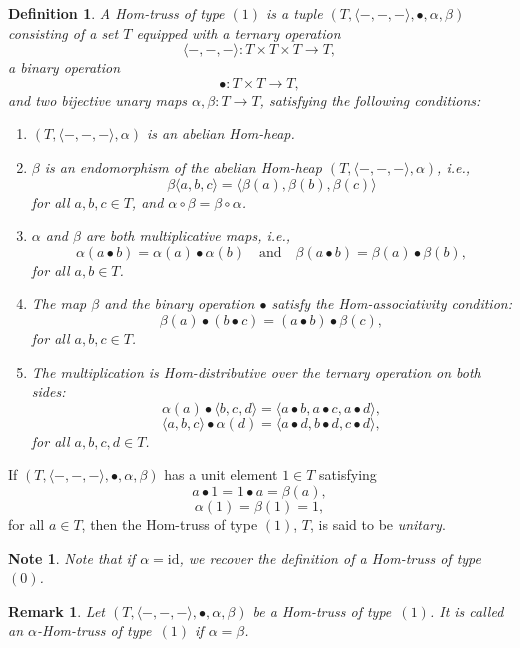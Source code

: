 \documentclass[14pt]{article}
\newtheorem{Note}[thm]{Note}
\theoremstyle{Definition}
\newtheorem{Def}[thm]{Definition}
\newtheorem{Rem}[thm]{Remark}
\theoremstyle{remark}
\begin{document}
\begin{Def}
A \emph{Hom-truss of type $(1)$} is a tuple 
$(T, \langle -,-,- \rangle, \bullet, \alpha, \beta)$ consisting of a set $T$ equipped with a ternary operation 
\[
\langle -,-,- \rangle : T \times T \times T \to T,
\]
a binary operation 
\[
\bullet : T \times T \to T,
\]
and two bijective unary maps $\alpha, \beta : T \to T$, satisfying the following conditions:
\begin{enumerate}
\item[$(1)$] $(T, \langle -,-,- \rangle, \alpha)$ is an abelian Hom-heap.
\item[$(2)$] $\beta$ is an endomorphism of the abelian Hom-heap $(T, \langle -,-,- \rangle, \alpha)$, i.e.,
\[
\beta\langle a,b,c\rangle = \langle \beta(a), \beta(b), \beta(c) \rangle
\]
for all $a,b,c \in T$, and $\alpha \circ \beta = \beta \circ \alpha$.
\item[$(3)$] $\alpha$ and $\beta$ are both multiplicative maps, i.e.,
\[
\alpha(a \bullet b) = \alpha(a) \bullet \alpha(b) \quad \text{and} \quad \beta(a \bullet b) = \beta(a) \bullet \beta(b),
\]
for all $a,b \in T$.
\item[$(4)$] The map $\beta$ and the binary operation $\bullet$ satisfy the \emph{Hom-associativity} condition:
\begin{equation}\label{eq1}
\beta(a) \bullet (b \bullet c) = (a \bullet b) \bullet \beta(c),
\end{equation}
for all $a,b,c \in T$.
\item[$(5)$] The multiplication is \emph{Hom-distributive} over the ternary operation on both sides:
\begin{equation}\label{eq2}
\alpha(a) \bullet \langle b,c,d \rangle = \langle a \bullet b, a \bullet c, a \bullet d \rangle,
\end{equation}
\begin{equation}\label{eq3}
\langle a,b,c \rangle \bullet \alpha(d) = \langle a \bullet d, b \bullet d, c \bullet d \rangle,
\end{equation}
for all $a,b,c,d \in T$.
\end{enumerate}
\end{Def}

If $(T,\langle-,-,-\rangle,\bullet,\alpha,\beta)$ has a unit element $1 \in T$ satisfying  
\begin{equation}\label{eq4}
a \bullet 1 = 1 \bullet a = \beta(a),
\end{equation}
\begin{equation}\label{eq5}
\alpha(1) = \beta(1) = 1,
\end{equation}
for all $a \in T$, then the Hom-truss of type $(1)$, $T$, is said to be \emph{unitary}.
\begin{Note}\label{Note 4.10}
Note that if $\alpha = \mathrm{id}$, we recover the definition of a Hom-truss of type $(0)$.
\end{Note}
\begin{Rem}
Let $(T,\langle-,-,-\rangle,\bullet,\alpha,\beta)$ be a Hom-truss of type~$(1)$.  
It is called an \emph{$\alpha$-Hom-truss of type~$(1)$} if $\alpha = \beta$.
\end{Rem}
\end{document}
